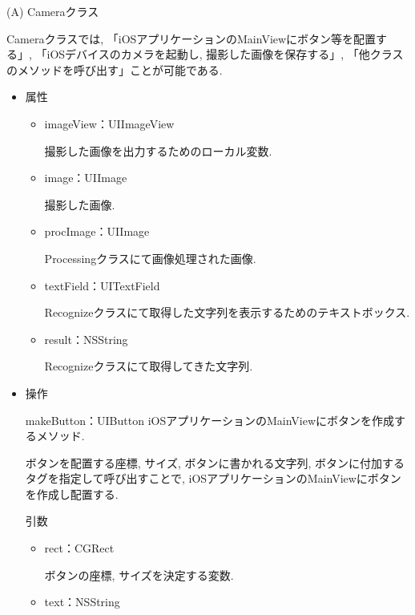 \begin{description}

\item (A) Cameraクラス

Cameraクラスでは, 「iOSアプリケーションのMainViewにボタン等を配置する」, 「iOSデバイスのカメラを起動し, 撮影した画像を保存する」, 「他クラスのメソッドを呼び出す」ことが可能である.

\begin{itemize}
\item 属性

\begin{breakbox}
\begin{itemize}
\item imageView：UIImageView

撮影した画像を出力するためのローカル変数.

\item image：UIImage

撮影した画像.

\item procImage：UIImage

Processingクラスにて画像処理された画像.

\item textField：UITextField

Recognizeクラスにて取得した文字列を表示するためのテキストボックス.

\item result：NSString

Recognizeクラスにて取得してきた文字列.
\end{itemize}
\end{breakbox}

\item 操作

\begin{itembox}[l]{makeButton：UIButton}
iOSアプリケーションのMainViewにボタンを作成するメソッド.

ボタンを配置する座標, サイズ, ボタンに書かれる文字列, ボタンに付加するタグを指定して呼び出すことで, iOSアプリケーションのMainViewにボタンを作成し配置する.

\begin{itembox}[l]{引数}
\begin{itemize}
\item rect：CGRect

ボタンの座標, サイズを決定する変数.

\item text：NSString


\end{itemize}
\end{itembox}
\end{itembox}
\end{itemize}
\end{description}
